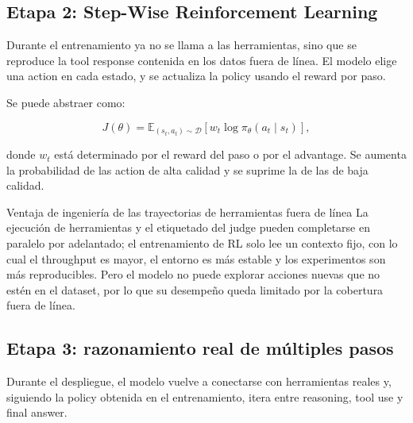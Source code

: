 \subsection{Etapa 2: Step-Wise Reinforcement Learning}

Durante el entrenamiento ya no se llama a las herramientas, sino que se reproduce la tool response contenida en los datos fuera de línea. El modelo elige una action en cada estado, y se actualiza la policy usando el reward por paso.



Se puede abstraer como:

$$
J(\theta)=\mathbb E_{(s_t,a_t)\sim\mathcal D}
\left[w_t\log\pi_\theta(a_t\mid s_t)\right],
$$

donde $w_t$ está determinado por el reward del paso o por el advantage. Se aumenta la probabilidad de las action de alta calidad y se suprime la de las de baja calidad.

\begin{knowledgebox}{Ventaja de ingeniería de las trayectorias de herramientas fuera de línea}
La ejecución de herramientas y el etiquetado del judge pueden completarse en paralelo por adelantado; el entrenamiento de RL solo lee un contexto fijo, con lo cual el throughput es mayor, el entorno es más estable y los experimentos son más reproducibles. Pero el modelo no puede explorar acciones nuevas que no estén en el dataset, por lo que su desempeño queda limitado por la cobertura fuera de línea.
\end{knowledgebox}

\subsection{Etapa 3: razonamiento real de múltiples pasos}

Durante el despliegue, el modelo vuelve a conectarse con herramientas reales y, siguiendo la policy obtenida en el entrenamiento, itera entre reasoning, tool use y final answer.


